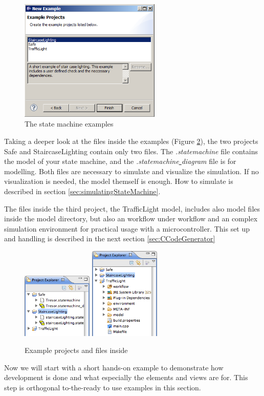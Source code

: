 \begin{figure}[ht] \center
\includegraphics[width=0.6\textwidth]{./Pictures/examplesWizard}
\caption{\label{fig:exampleWizard}The state machine examples} 
\end{figure}

Taking a deeper look at the files inside the examples (Figure
\ref{fig:easyExamples}), the two projects Safe and StaircaseLighting contain only
two files. The \textit{.statemachine} file contains the model of your state
machine, and the \textit{.statemachine\underline{ }diagram} file is for
modelling. Both files are necessary to simulate and visualize the simulation. If
no visualization is needed, the model themself is enough. How to simulate is
described in section \ref{sec:simulatingStateMachine}.

The files inside the third project, the TrafficLight model, includes also model
files inside the model directory, but also an workflow under workflow and an
complex simulation environment for practical usage with a microcontroller. This
set up and handling is described in the next section \ref{sec:CCodeGenerator}

\begin{figure}[htbp] \center
\includegraphics[width=0.3\textwidth]{./Pictures/easyExamples}
\includegraphics[width=0.3\textwidth]{./Pictures/complexExample}
\caption{\label{fig:easyExamples}Example projects and files inside} 
\end{figure}

Now we will start with a short hands-on example to demonstrate how development is
done and what especially the elements and views are for. This step is orthogonal
to-the-ready to use examples in this section.

\clearpage

